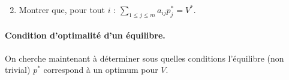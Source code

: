 \begin{enumerate}
  \setcounter{enumi}{1}
  \item Montrer que, pour tout $i$ : $\sum_{1 \leq j \leq m} a_{ij} p^*_j = V^*$.
\end{enumerate}

\bigskip
\paragraph{Condition d'optimalité d'un équilibre.}
On cherche maintenant à déterminer sous quelles conditions l'équilibre (non trivial) $p^*$ correspond à un optimum pour $V$.


